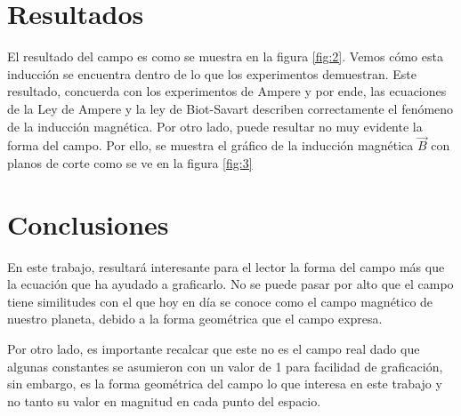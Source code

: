 \documentclass{article}
\begin{document}
\newpage
\begin{multicols}{2}
\section{Resultados}
El resultado del campo es como se muestra en la figura \ref{fig:2}. Vemos cómo esta inducción se encuentra dentro de lo que los experimentos demuestran. Este resultado, concuerda con los experimentos de Ampere y por ende, las ecuaciones de la Ley de Ampere y la ley de Biot-Savart describen correctamente el fenómeno de la inducción magnética.
Por otro lado, puede resultar no muy evidente la forma del campo. Por ello, se muestra el gráfico de la inducción magnética $\vec{B}$  con planos de corte como se ve en la figura \ref{fig:3}


\section{Conclusiones}
En este trabajo, resultará interesante para el lector la forma del campo más que la ecuación que ha ayudado a graficarlo. No se puede pasar por alto que el campo tiene similitudes con el que hoy en día se conoce como el campo magnético de nuestro planeta, debido a la forma geométrica que el campo expresa.


Por otro lado, es importante recalcar que este no es el campo real dado que algunas constantes se asumieron con un valor de 1 para facilidad de graficación, sin embargo, es la forma geométrica del campo lo que interesa en este trabajo y no tanto su valor en magnitud en cada punto del espacio. 




\end{multicols}
\end{document}
